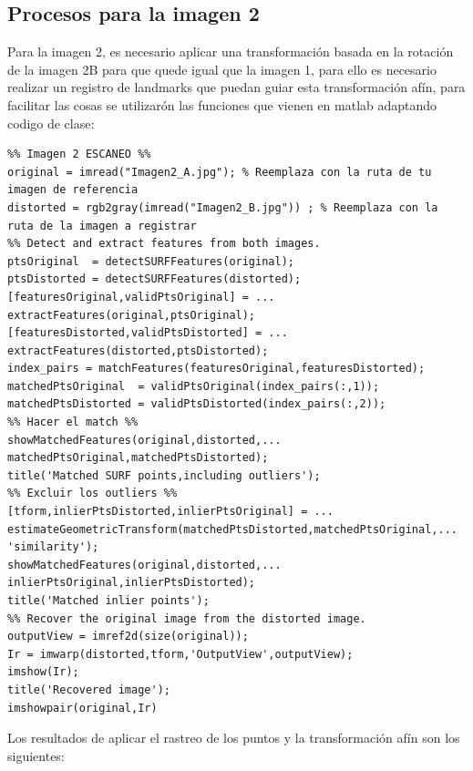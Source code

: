 \documentclass[11pt, letterpaper]{article}
\begin{document}
\newpage	

\subsection{Procesos para la imagen 2}

Para la imagen 2, es necesario aplicar una transformación basada en la rotación de la imagen 2B para que quede igual que la imagen 1, para ello es necesario realizar un registro de landmarks que puedan guiar esta transformación afín, para facilitar las cosas se utilizarón las funciones que vienen en matlab adaptando codigo de clase:


\begin{verbatim}
%% Imagen 2 ESCANEO %%
original = imread("Imagen2_A.jpg"); % Reemplaza con la ruta de tu imagen de referencia
distorted = rgb2gray(imread("Imagen2_B.jpg")) ; % Reemplaza con la ruta de la imagen a registrar
%% Detect and extract features from both images.
ptsOriginal  = detectSURFFeatures(original);
ptsDistorted = detectSURFFeatures(distorted);
[featuresOriginal,validPtsOriginal] = ...
extractFeatures(original,ptsOriginal);
[featuresDistorted,validPtsDistorted] = ...
extractFeatures(distorted,ptsDistorted);
index_pairs = matchFeatures(featuresOriginal,featuresDistorted);
matchedPtsOriginal  = validPtsOriginal(index_pairs(:,1));
matchedPtsDistorted = validPtsDistorted(index_pairs(:,2));
%% Hacer el match %% 
showMatchedFeatures(original,distorted,...
matchedPtsOriginal,matchedPtsDistorted);
title('Matched SURF points,including outliers');
%% Excluir los outliers %%
[tform,inlierPtsDistorted,inlierPtsOriginal] = ...
estimateGeometricTransform(matchedPtsDistorted,matchedPtsOriginal,...
'similarity');
showMatchedFeatures(original,distorted,...
inlierPtsOriginal,inlierPtsDistorted);
title('Matched inlier points');
%% Recover the original image from the distorted image.
outputView = imref2d(size(original));
Ir = imwarp(distorted,tform,'OutputView',outputView);
imshow(Ir); 
title('Recovered image');
imshowpair(original,Ir)
\end{verbatim}

\newpage

Los resultados de aplicar el rastreo de los puntos y la transformación afín son los siguientes:
\end{document}
